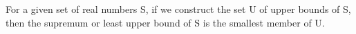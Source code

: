 For a given set of real numbers S, if we construct the set U of upper bounds of S,
then the supremum or least upper bound of S is the smallest member of U.